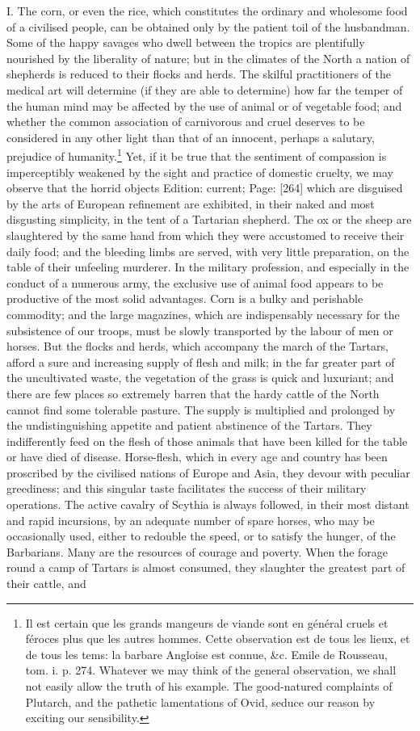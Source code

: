 I. The corn, or even the rice, which constitutes the ordinary and wholesome food of a civilised people, can be obtained only by the patient toil of the husbandman. Some of the happy savages who dwell between the tropics are plentifully nourished by the liberality of nature; but in the climates of the North a nation of shepherds is reduced to their flocks and herds. The skilful practitioners of the medical art will determine (if they are able to determine) how far the temper of the human mind may be affected by the use of animal or of vegetable food; and whether the common association of carnivorous and cruel deserves to be considered in any other light than that of an innocent, perhaps a salutary, prejudice of humanity.\footnote{Il est certain que les grands mangeurs de viande sont en général cruels et féroces plus que les autres hommes. Cette observation est de tous les lieux, et de tous les tems: la barbare Angloise est connue, \&c. Emile de Rousseau, tom. i. p. 274. Whatever we may think of the general observation, we shall not easily allow the truth of his example. The good-natured complaints of Plutarch, and the pathetic lamentations of Ovid, seduce our reason by exciting our sensibility.} Yet, if it be true that the sentiment of compassion is imperceptibly weakened by the sight and practice of domestic cruelty, we may observe that the horrid objects Edition: current; Page: [264] which are disguised by the arts of European refinement are exhibited, in their naked and most disgusting simplicity, in the tent of a Tartarian shepherd. The ox or the sheep are slaughtered by the same hand from which they were accustomed to receive their daily food; and the bleeding limbs are served, with very little preparation, on the table of their unfeeling murderer. In the military profession, and especially in the conduct of a numerous army, the exclusive use of animal food appears to be productive of the most solid advantages. Corn is a bulky and perishable commodity; and the large magazines, which are indispensably necessary for the subsistence of our troops, must be slowly transported by the labour of men or horses. But the flocks and herds, which accompany the march of the Tartars, afford a sure and increasing supply of flesh and milk; in the far greater part of the uncultivated waste, the vegetation of the grass is quick and luxuriant; and there are few places so extremely barren that the hardy cattle of the North cannot find some tolerable pasture. The supply is multiplied and prolonged by the undistinguishing appetite and patient abstinence of the Tartars. They indifferently feed on the flesh of those animals that have been killed for the table or have died of disease. Horse-flesh, which in every age and country has been proscribed by the civilised nations of Europe and Asia, they devour with peculiar greediness; and this singular taste facilitates the success of their military operations. The active cavalry of Scythia is always followed, in their most distant and rapid incursions, by an adequate number of spare horses, who may be occasionally used, either to redouble the speed, or to satisfy the hunger, of the Barbarians. Many are the resources of courage and poverty. When the forage round a camp of Tartars is almost consumed, they slaughter the greatest part of their cattle, and 